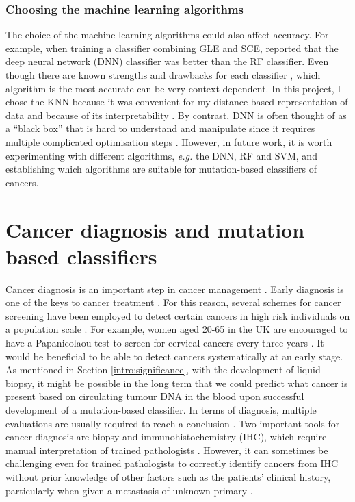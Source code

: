 

\subsubsection{Choosing the machine learning algorithms}
The choice of the machine learning algorithms could also affect accuracy. For example, when training a classifier combining GLE and SCE, \citet{Jiao2020} reported that the deep neural network (DNN) classifier was better than the RF classifier. Even though there are known strengths and drawbacks for each classifier \citep{Susmita2019AAlgorithms}, which algorithm is the most accurate can be very context dependent. In this project, I chose the KNN because it was convenient for my distance-based representation of data and because of its interpretability \citep{Aly2005SurveyMethods}. By contrast, DNN is often thought of as a ``black box'' that is hard to understand and manipulate since it requires multiple complicated optimisation steps \citep{Shwartz-Ziv2017OpeningInformation}. However, in future work, it is worth experimenting with different algorithms, \textit{e.g.} the DNN, RF and SVM, and establishing which algorithms are suitable for mutation-based classifiers of cancers. 

\section{Cancer diagnosis and mutation based classifiers}\label{discussion:diagnosis}
Cancer diagnosis is an important step in cancer management \citep{Tobias2014CancerManagement}. Early diagnosis is one of the keys to cancer treatment \citep{Hawkes2019CancerDiagnosis}. For this reason, several schemes for cancer screening have been employed to detect certain cancers in high risk individuals on a population scale \citep{Tobias2014CancerManagement}. For example, women aged 20-65 in the UK are encouraged to have a Papanicolaou test \citep{Bharadwaj2013HumanTreatment} to screen for cervical cancers every three years \citep{Tobias2014CancerManagement}. It would be beneficial to be able to detect cancers systematically at an early stage. As mentioned in Section \ref{intro:significance}, with the development of liquid biopsy, it might be possible in the long term that we could predict what cancer is present based on circulating tumour DNA in the blood upon successful development of a mutation-based classifier. In terms of diagnosis, multiple evaluations are usually required to reach a conclusion \citep{Tobias2014CancerManagement,Stone1995Biopsy:Pitfalls}. Two important tools for cancer diagnosis are biopsy and immunohistochemistry (IHC), which require manual interpretation of trained pathologists \citep{Stone1995Biopsy:Pitfalls,Ahmed200615Cancer}. However, it can sometimes be challenging even for trained pathologists to correctly identify cancers from IHC without prior knowledge of other factors such as the patients' clinical history, particularly when given a \gls{metastasis} of unknown primary \citep{Sheahan1993MetastaticStatus,Rassy2020ExploringToday}.  

